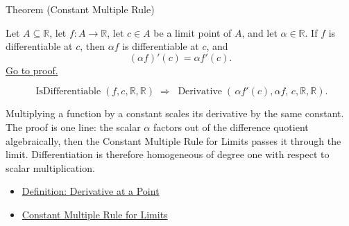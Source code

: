 
\begin{theorembox}{Theorem (Constant Multiple Rule)}
\begin{theorem}
\label{thm:constant-multiple-rule}
Let $A \subseteq \mathbb{R}$, let $f : A \to \mathbb{R}$, let $c \in A$ be a limit point of $A$, and let $\alpha \in \mathbb{R}$. If $f$ is differentiable at $c$, then $\alpha f$ is differentiable at $c$, and
\[
(\alpha f)'(c) = \alpha f'(c).
\]
\hyperref[prf:constant-multiple-rule]{Go to proof.}
\end{theorem}
\end{theorembox}

\begin{remark*}
\[
\operatorname{IsDifferentiable}(f,c,\mathbb{R},\mathbb{R}) \;\Rightarrow\;
\operatorname{Derivative}(\,\alpha f'(c),\alpha f,\,c,\mathbb{R},\mathbb{R}).
\]
\end{remark*}

\begin{remark*}[Interpretation]
Multiplying a function by a constant scales its derivative by the same constant. The proof is one line: the scalar $\alpha$ factors out of the difference quotient algebraically, then the Constant Multiple Rule for Limits passes it through the limit. Differentiation is therefore homogeneous of degree one with respect to scalar multiplication.
\end{remark*}

\begin{dependencies}
\begin{itemize}
  \item \hyperref[def:derivative-at-a-point]{Definition: Derivative at a Point}
  \item \hyperref[thm:limit-scalar-multiple]{Constant Multiple Rule for Limits}
\end{itemize}
\end{dependencies}


